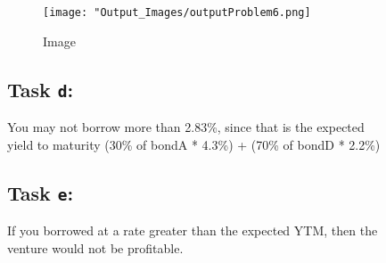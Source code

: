 \documentclass[
  12pt,
]{article}
\begin{document}
\begin{figure}
\centering
\texttt{[image: "Output\_Images/outputProblem6.png]}
\caption{Image}
\end{figure}

\hypertarget{task-d-2}{%
\subsection{\texorpdfstring{Task \texttt{d}:}{Task d:}}\label{task-d-2}}

You may not borrow more than 2.83\%, since that is the expected\\
yield to maturity (30\% of bondA * 4.3\%) + (70\% of bondD * 2.2\%)

\hypertarget{task-e-1}{%
\subsection{\texorpdfstring{Task \texttt{e}:}{Task e:}}\label{task-e-1}}

If you borrowed at a rate greater than the expected YTM, then the\\
venture would not be profitable.
\end{document}

